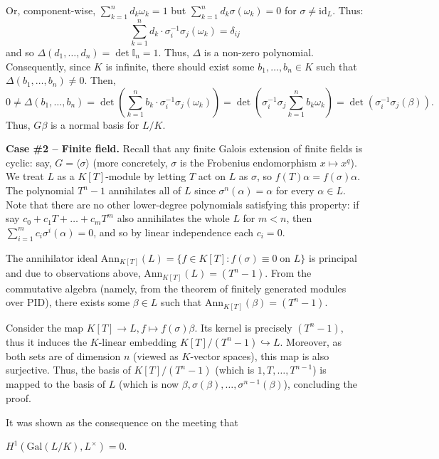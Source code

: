 \documentclass{template}
\begin{document}
Or, component-wise, $\sum_{k=1}^n d_k\omega_k = 1$ but $\sum_{k=1}^n
d_k\sigma(\omega_k)=0$ for $\sigma \neq \text{id}_L$. Thus:
\begin{equation*}
    \sum_{k=1}^n d_k \cdot \sigma_i^{-1}\sigma_j(\omega_k) = \delta_{ij}
\end{equation*}
and so $\Delta(d_1,\dots,d_n) = \det \mathbb{I}_n = 1$. Thus, $\Delta$ is a
non-zero polynomial. Consequently, since $K$ is infinite, there should 
exist some $b_1,\dots,b_n \in K$ such that $\Delta(b_1,\dots,b_n) \neq 0$. Then,
\begin{equation*}
    0 \neq \Delta(b_1,\dots,b_n) = \det\left(\sum_{k=1}^n b_k \cdot \sigma_i^{-1}\sigma_j(\omega_k)\right) = \det\left(\sigma_i^{-1}\sigma_j\sum_{k=1}^n b_k \omega_k\right) = \det(\sigma_i^{-1}\sigma_j(\beta)).
\end{equation*}
Thus, $G\beta$ is a normal basis for $L/K$.

\textcolor{green!70!black}{\textbf{Case \#2 -- Finite field.}} Recall that any
finite Galois extension of finite fields is cyclic: say, $G = \langle \sigma
\rangle$ (more concretely, $\sigma$ is the Frobenius endomorphism $x \mapsto
x^q$). We treat $L$ as a $K[T]$-module by letting $T$ act on $L$ as $\sigma$, so
$f(T)\alpha = f(\sigma)\alpha$. The polynomial $T^n-1$ annihilates all of $L$
since $\sigma^n(\alpha)=\alpha$ for every $\alpha \in L$. Note that there are no
other lower-degree polynomials satisfying this property: if say
$c_0+c_1T+\dots+c_{m}T^m$ also annihilates the whole $L$ for $m<n$, then
$\sum_{i=1}^m c_i\sigma^i(\alpha)=0$, and so by linear independence each
$c_i=0$.

The annihilator ideal $\text{Ann}_{K[T]}(L)=\{f \in K[T]: f(\sigma) \equiv 0 \;
\text{on $L$}\}$ is principal and due to observations above,
$\text{Ann}_{K[T]}(L) = (T^n-1)$. From the commutative algebra (namely, from the
theorem of finitely generated modules over PID), there exists some $\beta \in L$
such that $\text{Ann}_{K[T]}(\beta) = (T^n-1)$.

Consider the map $K[T] \to L, f \mapsto f(\sigma)\beta$. Its kernel is precisely
$(T^n-1)$, thus it induces the $K$-linear embedding $K[T]/(T^n-1)
\hookrightarrow L$. Moreover, as both sets are of dimension $n$ (viewed as
$K$-vector spaces), this map is also surjective. Thus, the basis of
$K[T]/(T^n-1)$ (which is $1,T,\dots,T^{n-1}$) is mapped to the basis of $L$
(which is now $\beta,\sigma(\beta),\dots,\sigma^{n-1}(\beta)$), concluding the
proof.

It was shown as the consequence on the meeting that
\begin{theorem}
    $H^1(\text{Gal}(L/K), L^{\times}) = 0$.
\end{theorem}
\end{document}
